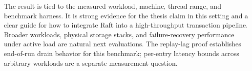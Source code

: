 The result is tied to the measured workload, machine, thread range, and
benchmark harness. It is strong evidence for the thesis claim in this setting
and a clear guide for how to integrate Raft into a high-throughput transaction
pipeline. Broader workloads, physical storage stacks, and failure-recovery
performance under active load are natural next evaluations. The replay-lag
proof establishes end-of-run drain behavior for this benchmark; per-entry
latency bounds across arbitrary workloads are a separate measurement question.
